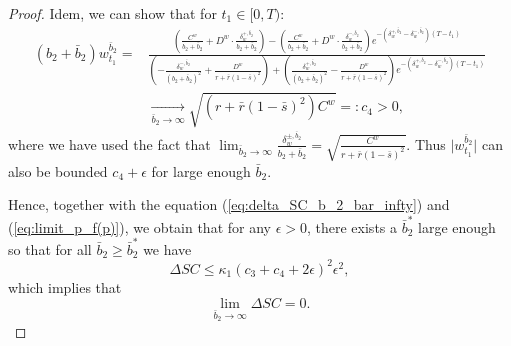 \documentclass[11pt]{article}
\begin{document}
\begin{proof}
 	Idem, we can show that for $t_1 \in [0,T)$:
	\begin{equation*}
	\begin{split}
	(b_2 + \bar{b}_2) w^{\bar{b}_2}_{t_1} =&\frac{ \left( \frac{C^{w}}{b_2 + \bar{b}_2} + D^{w}\cdot \frac{\delta^{+,\bar{b}_2}_w}{b_2 + \bar{b}_2}  \right) - \left( \frac{C^{w}}{b_2 + \bar{b}_2} + D^{w}\cdot \frac{\delta^{-,\bar{b}_2}_w}{b_2 + \bar{b}_2}  \right) e^{- (\delta^{+,\bar{b}_2}_w - \delta^{-,\bar{b}_2}_w)(T- t_1)}}{ \left(- \frac{\delta^{-,\bar{b}_2}_w}{(b_2 + \bar{b}_2)^2} + \frac{D^{w}}{r + \bar{r}(1-\bar{s})^2} \right) + \left( \frac{\delta^{+,\bar{b}_2}_w}{(b_2 + \bar{b}_2)^2} - \frac{D^{w}}{r + \bar{r}(1-\bar{s})^2} \right)e^{- (\delta^{+,\bar{b}_2}_w - \delta^{-,\bar{b}_2}_w)(T-t_1)} }\\
	&\xrightarrow[\bar{b}_2 \to \infty]{} \sqrt{(r + \bar{r}(1-\bar{s})^2) C^w} =: c_4 >0,
	\end{split}
	\end{equation*}
	where we have used the fact that $\lim_{\bar{b}_2 \to \infty}\frac{\delta^{\pm,\bar{b}_2}_w}{b_2 + \bar{b}_2}=\sqrt{\frac{C^w}{r+\bar{r}(1-\bar{s})^2}}$. Thus $ \vert w_{t_1}^{\bar{b}_2} \vert $ can also be bounded $c_4 + \epsilon$ for large enough $\bar{b}_2$.
	
	Hence, together with the equation (\ref{eq:delta_SC_b_2_bar_infty}) and  (\ref{eq:limit_p_f(p)}), we obtain that for any $\epsilon > 0$, there exists a $\bar{b}_2^*$ large enough so that for all $\bar{b}_2 \geq \bar{b}_2^*$ we have
	$$ \Delta SC \leq \kappa_1 (c_3 + c_4 + 2 \epsilon)^2 \epsilon^2 ,$$
	which implies that 
	$$\lim_{\bar{b}_2 \to \infty} \Delta SC = 0.$$
	

\end{proof}
\end{document}
